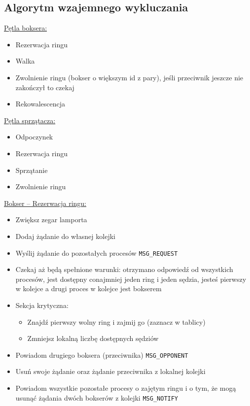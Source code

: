 \documentclass{article}
\begin{document}
\subsection{Algorytm wzajemnego wykluczania}

\underline{Pętla boksera:}
\begin{itemize}
    \item Rezerwacja ringu
    \item Walka
    \item Zwolnienie ringu (bokser o większym id z pary), jeśli
    przeciwnik jeszcze nie zakończył to czekaj
    \item Rekowalescencja
\end{itemize}

\underline{Pętla sprzątacza:}
\begin{itemize}
    \item Odpoczynek
    \item Rezerwacja ringu
    \item Sprzątanie
    \item Zwolnienie ringu
\end{itemize}

\underline{Bokser -- Rezerwacja ringu:}
\begin{itemize}
    \item Zwiększ zegar lamporta
    \item Dodaj żądanie do własnej kolejki
    \item Wyślij żądanie do pozostałych procesów \verb|MSG_REQUEST|
    \item Czekaj aż będą spełnione warunki: otrzymano odpowiedź od
    wszystkich procesów, jest dostępny conajmniej jeden ring i jeden
    sędzia, jesteś pierwszy w kolejce a drugi proces w kolejce jest
    bokserem
    \item Sekcja krytyczna:
    \begin{itemize}
        \item Znajdź pierwszy wolny ring i zajmij go (zaznacz w tablicy)
        \item Zmniejsz lokalną liczbę dostępnych sędziów
    \end{itemize}
    \item Powiadom drugiego boksera (przeciwnika) \verb|MSG_OPPONENT|
    \item Usuń swoje żądanie oraz żądanie przeciwnika z lokalnej kolejki
    \item Powiadom wszystkie pozostałe procesy o zajętym ringu i o tym,
    że mogą usunąć żądania dwóch bokserów z kolejki \verb|MSG_NOTIFY|
\end{itemize}
\end{document}
